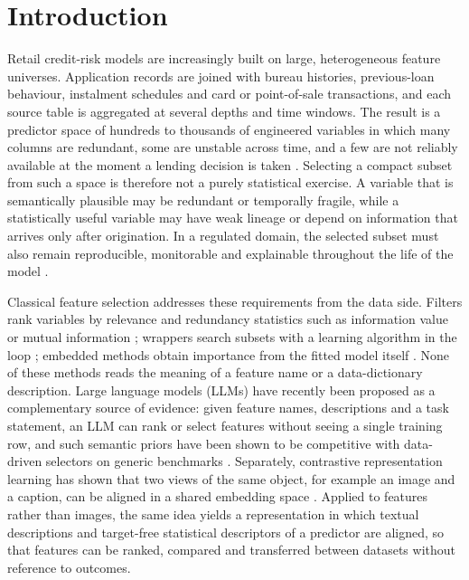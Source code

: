 \documentclass[preprint,12pt]{elsarticle}
\begin{document}

\section{Introduction}
\label{sec:introduction}

Retail credit-risk models are increasingly built on large, heterogeneous feature universes. Application records are joined with bureau histories, previous-loan behaviour, instalment schedules and card or point-of-sale transactions, and each source table is aggregated at several depths and time windows. The result is a predictor space of hundreds to thousands of engineered variables in which many columns are redundant, some are unstable across time, and a few are not reliably available at the moment a lending decision is taken \cite{thomas2002,siddiqi2006,anderson2007}. Selecting a compact subset from such a space is therefore not a purely statistical exercise. A variable that is semantically plausible may be redundant or temporally fragile, while a statistically useful variable may have weak lineage or depend on information that arrives only after origination. In a regulated domain, the selected subset must also remain reproducible, monitorable and explainable throughout the life of the model \cite{lessmann2015,gunnarsson2021,ballegeer2025}.

Classical feature selection addresses these requirements from the data side. Filters rank variables by relevance and redundancy statistics such as information value or mutual information \cite{guyon2003,peng2005}; wrappers search subsets with a learning algorithm in the loop \cite{kohavi1997,guyon2002,kursa2010}; embedded methods obtain importance from the fitted model itself \cite{tibshirani1996,lundberg2017}. None of these methods reads the meaning of a feature name or a data-dictionary description. Large language models (LLMs) have recently been proposed as a complementary source of evidence: given feature names, descriptions and a task statement, an LLM can rank or select features without seeing a single training row, and such semantic priors have been shown to be competitive with data-driven selectors on generic benchmarks \cite{jeong2025,li2025sigkdd,zhang2025llmlasso,choi2022}. Separately, contrastive representation learning has shown that two views of the same object, for example an image and a caption, can be aligned in a shared embedding space \cite{radford2021,oord2018}. Applied to features rather than images, the same idea yields a representation in which textual descriptions and target-free statistical descriptors of a predictor are aligned, so that features can be ranked, compared and transferred between datasets without reference to outcomes.
\end{document}
